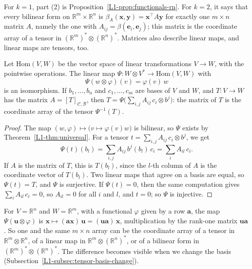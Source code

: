 For $k = 1$, part (2) is Proposition~\ref{L1-prop:functionals-rn}. For $k = 2$, it says that every bilinear form on $\mathbb{R}^m \times \mathbb{R}^n$ is $\beta_A(\mathbf{x}, \mathbf{y}) = \mathbf{x}^\top A\mathbf{y}$ for exactly one $m \times n$ matrix $A$, namely the one with $A_{ij} = \beta(\mathbf{e}_i, \mathbf{e}_j)$; this matrix is the coordinate array of a tensor in $(\mathbb{R}^m)^* \otimes (\mathbb{R}^n)^*$. Matrices also describe linear maps, and linear maps are tensors, too.

\begin{proposition}\label{L1-prop:linear-maps-tensors}
    Let $\mathrm{Hom}(V, W)$ be the vector space of linear transformations $V \to W$, with the pointwise operations. The linear map $\Psi: W \otimes V^* \to \mathrm{Hom}(V, W)$ with
    \[\Psi(w \otimes \varphi)(v) = \varphi(v)\, w\]
    is an isomorphism. If $b_1, \ldots, b_n$ and $c_1, \ldots, c_m$ are bases of $V$ and $W$, and $T: V \to W$ has the matrix $A = [T]_{\mathcal{C}, \mathcal{B}}$, then $T = \Psi\big(\sum_{i,j} A_{ij}\, c_i \otimes b^j\big)$: the matrix of $T$ is the coordinate array of the tensor $\Psi^{-1}(T)$.
\end{proposition}

\begin{proof}
    The map $(w, \varphi) \mapsto \big(v \mapsto \varphi(v)w\big)$ is bilinear, so $\Psi$ exists by Theorem~\ref{L1-thm:universal}. For a tensor $t = \sum_{i,j} A_{ij}\, c_i \otimes b^j$, we get
    \[\Psi(t)(b_l) = \sum_{i,j} A_{ij}\, b^j(b_l)\, c_i = \sum_i A_{il}\, c_i.\]
    If $A$ is the matrix of $T$, this is $T(b_l)$, since the $l$-th column of $A$ is the coordinate vector of $T(b_l)$. Two linear maps that agree on a basis are equal, so $\Psi(t) = T$, and $\Psi$ is surjective. If $\Psi(t) = 0$, then the same computation gives $\sum_i A_{il}\, c_i = 0$, so $A_{il} = 0$ for all $i$ and $l$, and $t = 0$; so $\Psi$ is injective.
\end{proof}

For $V = \mathbb{R}^n$ and $W = \mathbb{R}^m$, with a functional $\varphi$ given by a row $\mathbf{a}$, the map $\Psi(\mathbf{u} \otimes \varphi)$ is $\mathbf{x} \mapsto (\mathbf{a}\mathbf{x})\,\mathbf{u} = (\mathbf{u}\mathbf{a})\,\mathbf{x}$, multiplication by the rank-one matrix $\mathbf{u}\mathbf{a}$. So one and the same $m \times n$ array can be the coordinate array of a tensor in $\mathbb{R}^m \otimes \mathbb{R}^n$, of a linear map in $\mathbb{R}^m \otimes (\mathbb{R}^n)^*$, or of a bilinear form in $(\mathbb{R}^m)^* \otimes (\mathbb{R}^n)^*$. The difference becomes visible when we change the basis (Subsection~\ref{L1-subsec:tensor-basis-change}).

